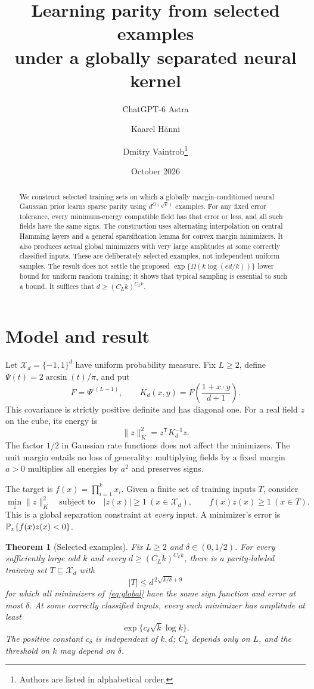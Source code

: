 \documentclass[11pt,a4paper]{article}
\title{Learning parity from selected examples\\under a globally separated neural kernel}
\author{ChatGPT-6 Astra \and Kaarel H\"anni \and Dmitry Vaintrob\thanks{Authors are listed in alphabetical order.}}
\date{October 2026}
\newtheorem{theorem}{Theorem}
\theoremstyle{remark}\newtheorem{remark}[theorem]{Remark}
\newcommand{\normK}[1]{\lVert #1\rVert_K}
\begin{document}
\maketitle
\begin{abstract}
We construct selected training sets on which a globally margin-conditioned
neural Gaussian prior learns sparse parity using $d^{O(\sqrt{k})}$ examples.
For any fixed error tolerance, every minimum-energy compatible field has
that error or less, and all such fields have the same signs. The construction
uses alternating interpolation on central Hamming layers and a general
sparsification lemma for convex margin minimizers. It also produces actual
global minimizers with very large amplitudes at some correctly classified inputs.
These are deliberately selected examples, not independent uniform samples.
The result does not settle the proposed $\exp\{\Omega(k\log(ed/k))\}$ lower
bound for uniform random training; it shows that typical sampling is essential
to such a bound. It suffices that $d\ge(C_Lk)^{C_Lk}$.
\end{abstract}

\section{Model and result}
Let $\mathcal X_d=\{-1,1\}^d$ have uniform probability measure. Fix
$L\ge2$, define $\Psi(t)=2\arcsin(t)/\pi$, and put
\[
 F=\Psi^{\circ(L-1)},\qquad
 K_d(x,y)=F\!\left(\frac{1+x\cdot y}{d+1}\right).
\]
This covariance is strictly positive definite and has diagonal one. For a
real field $z$ on the cube, its energy is
\[
 \normK z^2=z^{\mathsf T}K_d^{-1}z.
\]
The factor $1/2$ in Gaussian rate functions does not affect the minimizers.
The unit margin entails no loss of generality: multiplying fields by a
fixed margin $a>0$ multiplies all energies by $a^2$ and preserves signs.

The target is $f(x)=\prod_{i=1}^k x_i$. Given a finite set of training
inputs $T$, consider
\begin{equation}\label{eq:global}
 \min_z\normK z^2\quad\text{subject to}\quad
 |z(x)|\ge1\ (x\in\mathcal X_d),\qquad f(x)z(x)\ge1\ (x\in T).
\end{equation}
This is a global separation constraint at \emph{every} input. A minimizer's
error is $\mathbb P_x\{f(x)z(x)<0\}$.

\begin{theorem}[Selected examples]\label{thm:main}
Fix $L\ge2$ and $\delta\in(0,1/2)$. For every sufficiently large odd $k$
and every $d\ge(C_Lk)^{C_Lk}$, there is a parity-labeled training set
$T\subseteq\mathcal X_d$ with
\[
 |T|\le d^{\,2\sqrt{k/\delta}+9}
\]
for which all minimizers of~\eqref{eq:global} have the same sign function
and error at most $\delta$. At some correctly classified inputs, every such
minimizer has amplitude at least
\[
 \exp\{c_\delta\sqrt{k}\log k\}.
\]
The positive constant $c_\delta$ is independent of $k,d$; $C_L$ depends
only on $L$, and the threshold on $k$ may depend on $\delta$.
\end{theorem}
\end{document}
